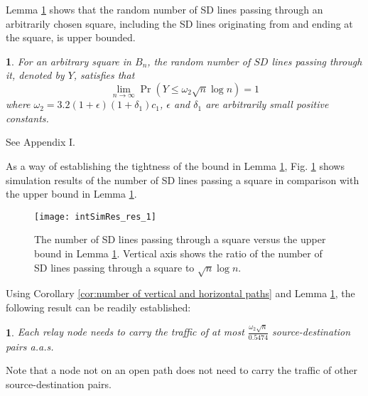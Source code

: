 \documentclass[english]{IEEEtran}
\theoremstyle{plain}
\theoremstyle{plain}
\theoremstyle{plain}
\newtheorem{lem}[thm]{\protect\lemmaname}
\theoremstyle{remark}
\providecommand{\lemmaname}{Lemma}
\begin{document}
Lemma \ref{lem:number of SD lines intersecting any square} shows
that the random number of SD lines passing through an arbitrarily
chosen square, including the SD lines originating from and ending
at the square, is upper bounded. 
\begin{lem}
\label{lem:number of SD lines intersecting any square}For an arbitrary
square in $B_{n}$, the random number of $SD$ lines passing through
it, denoted by $Y$, satisfies that
\begin{equation}
\lim_{n\rightarrow\infty}\Pr\left(Y\leq\omega_{2}\sqrt{n}\log n\right)=1\label{eq:bound on the number of SD line through a square}
\end{equation}
where $\omega_{2}=3.2\left(1+\epsilon\right)\left(1+\delta_{1}\right)c_{1}$,
$\epsilon$ and $\delta_{1}$ are arbitrarily small positive constants.\end{lem}
\begin{IEEEproof}
See Appendix I.
\end{IEEEproof}
As a way of establishing the tightness of the bound in Lemma \ref{lem:number of SD lines intersecting any square},
Fig. \ref{fig:number of SD lines} shows simulation results of the
number of SD lines passing a square in comparison with the upper bound
in Lemma \ref{lem:number of SD lines intersecting any square}. 

\begin{figure}
\begin{centering}
\texttt{[image: intSimRes\_res\_1]}
\par\end{centering}

\protect\caption{\label{fig:number of SD lines}The number of SD lines passing through
a square versus the upper bound in Lemma \ref{lem:number of SD lines intersecting any square}.
Vertical axis shows the ratio of the number of SD lines passing through
a square to $\sqrt{n}\log n$.}
\end{figure}


Using Corollary \ref{cor:number of vertical and horizontal paths}
and Lemma \ref{lem:number of SD lines intersecting any square}, the
following result can be readily established:
\begin{lem}
\label{lem:result on traffic load}Each relay node needs to carry
the traffic of at most $\frac{\omega_{2}\sqrt{n}}{0.5474}$ source-destination
pairs a.a.s.
\end{lem}
Note that a node not on an open path does not need to carry the traffic
of other source-destination pairs.
\end{document}
